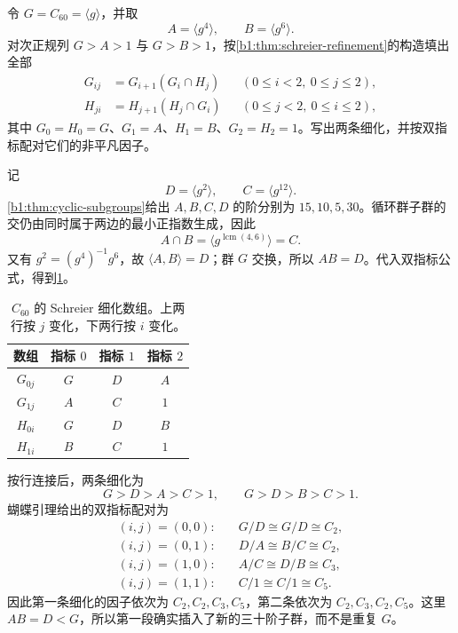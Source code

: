 \begin{exercise}\label{b1:ex:07-schreier-c12}
	令 \(G=C_{60}=\langle g\rangle\)，并取
	\[
		A=\langle g^4\rangle,\qquad B=\langle g^6\rangle.
	\]
	对次正规列 \(G>A>1\) 与 \(G>B>1\)，按\cref{b1:thm:schreier-refinement}的构造填出全部
	\[
		\begin{aligned}
			G_{ij}&=G_{i+1}(G_i\cap H_j)&& (0\leq i<2,\ 0\leq j\leq2),\\
			H_{ji}&=H_{j+1}(H_j\cap G_i)&& (0\leq j<2,\ 0\leq i\leq2),
		\end{aligned}
	\]
	其中 \(G_0=H_0=G\)、\(G_1=A\)、\(H_1=B\)、\(G_2=H_2=1\)。写出两条细化，并按双指标配对它们的非平凡因子。
\end{exercise}
\begin{solution}
	记
	\[
		D=\langle g^2\rangle,\qquad C=\langle g^{12}\rangle.
	\]
	\cref{b1:thm:cyclic-subgroups}给出 \(A,B,C,D\) 的阶分别为 \(15,10,5,30\)。循环群子群的交仍由同时属于两边的最小正指数生成，因此
	\[
		A\cap B=\langle g^{\operatorname{lcm}(4,6)}\rangle=C.
	\]
	又有 \(g^2=(g^4)^{-1}g^6\)，故 \(\langle A,B\rangle=D\)；群 \(G\) 交换，所以 \(AB=D\)。代入双指标公式，得到\cref{b1:tab:schreier-c12-arrays}。

	\begin{table}[htbp]
		\centering
		\caption[\(C_{60}\) 的 Schreier 细化数组]{\(C_{60}\) 的 Schreier 细化数组。上两行按 \(j\) 变化，下两行按 \(i\) 变化。}
		\label{b1:tab:schreier-c12-arrays}
		\begin{tabular}{@{}cccc@{}}
			\toprule
			数组 & 指标 \(0\) & 指标 \(1\) & 指标 \(2\) \\
			\midrule
			\(G_{0j}\) & \(G\) & \(D\) & \(A\) \\
			\(G_{1j}\) & \(A\) & \(C\) & \(1\) \\
			\(H_{0i}\) & \(G\) & \(D\) & \(B\) \\
			\(H_{1i}\) & \(B\) & \(C\) & \(1\) \\
			\bottomrule
		\end{tabular}
	\end{table}

	按行连接后，两条细化为
	\[
		G>D>A>C>1,\qquad G>D>B>C>1.
	\]
	蝴蝶引理给出的双指标配对为
	\[
		\begin{aligned}
			(i,j)=(0,0):&\quad G/D\cong G/D\cong C_2,\\
			(i,j)=(0,1):&\quad D/A\cong B/C\cong C_2,\\
			(i,j)=(1,0):&\quad A/C\cong D/B\cong C_3,\\
			(i,j)=(1,1):&\quad C/1\cong C/1\cong C_5.
		\end{aligned}
	\]
	因此第一条细化的因子依次为 \(C_2,C_2,C_3,C_5\)，第二条依次为 \(C_2,C_3,C_2,C_5\)。这里 \(AB=D<G\)，所以第一段确实插入了新的三十阶子群，而不是重复 \(G\)。
\end{solution}

